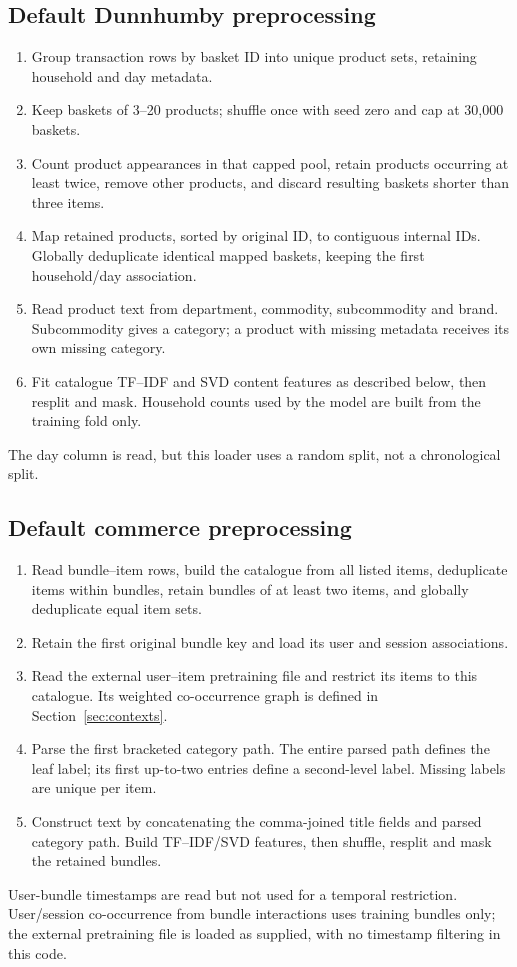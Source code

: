 \documentclass[11pt,a4paper]{article}
\numberwithin{equation}{section}
\begin{document}
\subsection{Default Dunnhumby preprocessing}
\begin{enumerate}
\item Group transaction rows by basket ID into unique product sets, retaining household and day metadata.
\item Keep baskets of 3--20 products; shuffle once with seed zero and cap at 30,000 baskets.
\item Count product appearances in that capped pool, retain products occurring at least twice,
      remove other products, and discard resulting baskets shorter than three items.
\item Map retained products, sorted by original ID, to contiguous internal IDs. Globally
      deduplicate identical mapped baskets, keeping the first household/day association.
\item Read product text from department, commodity, subcommodity and brand. Subcommodity
      gives a category; a product with missing metadata receives its own missing category.
\item Fit catalogue TF--IDF and SVD content features as described below, then resplit and mask.
      Household counts used by the model are built from the training fold only.
\end{enumerate}
The day column is read, but this loader uses a random split, not a chronological split.

\subsection{Default commerce preprocessing}
\begin{enumerate}
\item Read bundle--item rows, build the catalogue from all listed items, deduplicate items
      within bundles, retain bundles of at least two items, and globally deduplicate equal item sets.
\item Retain the first original bundle key and load its user and session associations.
\item Read the external user--item pretraining file and restrict its items to this catalogue.
      Its weighted co-occurrence graph is defined in Section~\ref{sec:contexts}.
\item Parse the first bracketed category path. The entire parsed path defines the leaf label;
      its first up-to-two entries define a second-level label. Missing labels are unique per item.
\item Construct text by concatenating the comma-joined title fields and parsed category path.
      Build TF--IDF/SVD features, then shuffle, resplit and mask the retained bundles.
\end{enumerate}
User-bundle timestamps are read but not used for a temporal restriction. User/session
co-occurrence from bundle interactions uses training bundles only; the external pretraining
file is loaded as supplied, with no timestamp filtering in this code.
\end{document}
